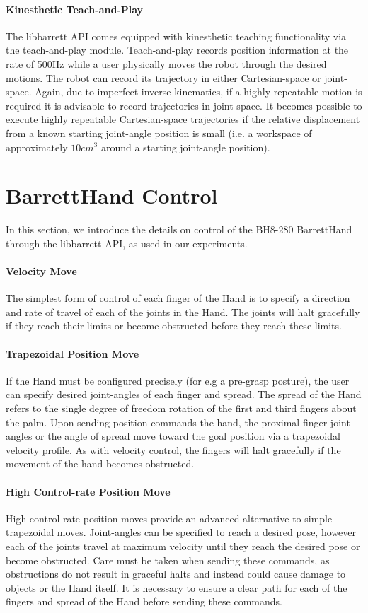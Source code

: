 \paragraph{Kinesthetic Teach-and-Play}
The libbarrett API comes equipped with kinesthetic teaching functionality via the teach-and-play module.
Teach-and-play records position information at the rate of 500Hz while a user physically moves the robot through the desired motions.
The robot can record its trajectory in either Cartesian-space or joint-space.
Again, due to imperfect inverse-kinematics, if a highly repeatable motion is required it is advisable to record trajectories in joint-space.
It becomes possible to execute highly repeatable Cartesian-space trajectories if the relative displacement from a known starting joint-angle position is small (i.e. a workspace of approximately $10cm^3$ around a starting joint-angle position).

\section{BarrettHand Control}

In this section, we introduce the details on control of the BH8-280 BarrettHand through the libbarrett API, as used in our experiments.

\paragraph{Velocity Move}
The simplest form of control of each finger of the Hand is to specify a direction and rate of travel of each of the joints in the Hand.
The joints will halt gracefully if they reach their limits or become obstructed before they reach these limits.

\paragraph{Trapezoidal Position Move}
If the Hand must be configured precisely (for e.g a pre-grasp posture), the user can specify desired joint-angles of each finger and spread.
The spread of the Hand refers to the single degree of freedom rotation of the first and third fingers about the palm.
Upon sending position commands the hand, the proximal finger joint angles or the angle of spread move toward the goal position via a trapezoidal velocity profile.
As with velocity control, the fingers will halt gracefully if the movement of the hand becomes obstructed.

\paragraph{High Control-rate Position Move}
High control-rate position moves provide an advanced alternative to simple trapezoidal moves.
Joint-angles can be specified to reach a desired pose, however each of the joints travel at maximum velocity until they reach the desired pose or become obstructed.
Care must be taken when sending these commands, as obstructions do not result in graceful halts and instead could cause damage to objects or the Hand itself.
It is necessary to ensure a clear path for each of the fingers and spread of the Hand before sending these commands.

